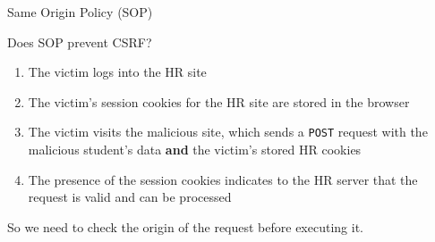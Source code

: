 \begin{parag}{Same Origin Policy (SOP)}
\begin{subparag}{Does SOP prevent CSRF?}
        \begin{enumerate}
            \item The victim logs into the HR site
            \item The victim's session cookies for the HR site are stored in the browser
            \item The victim visits the malicious site, which sends a \texttt{POST} request with the malicious student's data \textbf{and} the victim's stored HR cookies
            \item The presence of the session cookies indicates to the HR server that the request is valid and can be processed
        \end{enumerate}
        So we need to check the origin of the request before executing it.
    \end{subparag}
\end{parag}

